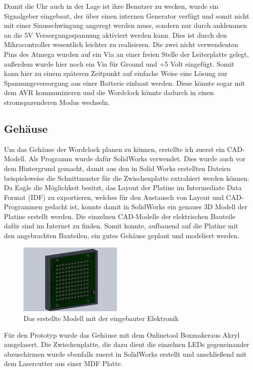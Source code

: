 \documentclass[12pt,journal,compsoc]{IEEEtran}
\begin{document}
Damit die Uhr auch in der Lage ist ihre Benutzer zu wecken, wurde ein Signalgeber eingebaut, der über einen internen Generator verfügt und somit nicht mit einer Sinusschwingung angeregt werden muss, sondern nur durch anklemmen an die 5V Versorgungsspannung aktiviert werden kann. Dies ist durch den Mikrocontroller wesentlich leichter zu realisieren.
Die zwei nicht verwendenten Pins des Atmega wurden auf ein Via an einer freien Stelle der Leiterplatte gelegt, außerdem wurde hier noch ein Via für Ground und +5 Volt eingefügt. Somit kann hier zu einem späteren Zeitpunkt auf einfache Weise eine Lösung zur Spannungsversorgung aus einer Batterie einbaut werden. Diese könnte sogar mit dem AVR kommunizieren und die Wordclock könnte dadurch in einen stromsparenderen Modus wechseln.  


\subsection{Gehäuse}
Um das Gehäuse der Wordclock planen zu können, erstellte ich zuerst ein CAD-Modell. Als Programm wurde dafür SolidWorks verwendet. Dies wurde auch vor dem Hintergrund gemacht, damit aus den in Solid Works erstellten Dateien beispielsweise die Schnittmuster für die Zwischenplatte extrahiert werden können. Da Eagle die Möglichkeit besitzt, das Layout der Platine im Intermediate Data Format  (IDF) zu exportieren, welches für den Austausch von Layout und CAD-Programmen gedacht ist, konnte damit in SolidWorks ein genaues 3D Modell der Platine erstellt werden. Die einzelnen CAD-Modelle der elektrischen Bauteile dafür sind im Internet zu finden. Somit konnte, aufbauend auf die Platine mit den angebrachten Bauteilen, ein gutes Gehäuse geplant und modeliert werden. 
\begin{figure}[h]
	\centering
	\includegraphics[width=0.45\textwidth]{Bilder/SW2}
	\caption{Das erstellte Modell mit der eingebauter Elektronik} 
	\label{fig:SW2}
\end{figure}
Für den Prototyp wurde das Gehäuse mit dem Onlinetool \glqq Boxmaker\grqq aus Akryl ausgelasert. Die Zwischenplatte, die dazu dient die einzelnen LEDs gegeneinander abzuschirmen wurde ebenfalls zuerst in SolidWorks erstellt und anschließend mit dem Lasercutter aus einer MDF Platte.
\end{document}
